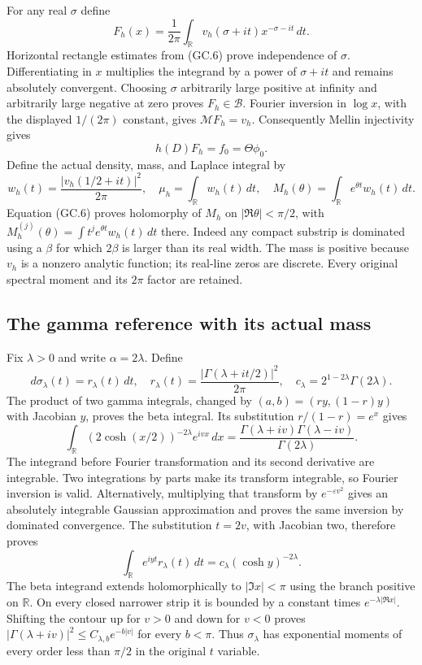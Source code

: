 For any real $\sigma$ define
\[
 F_h(x)=\frac1{2\pi}\int_{\mathbb R}
              v_h(\sigma+it)x^{-\sigma-it}\,dt.                \tag{GC.7}
\]
Horizontal rectangle estimates from (GC.6) prove independence of
$\sigma$. Differentiating in $x$ multiplies the integrand by a
power of $\sigma+it$ and remains absolutely convergent. Choosing
$\sigma$ arbitrarily large positive at infinity and arbitrarily
large negative at zero proves $F_h\in\mathscr B$. Fourier inversion
in $\log x$, with the displayed $1/(2\pi)$ constant, gives
$\mathcal MF_h=v_h$. Consequently Mellin injectivity gives
\[
 h(D)F_h=f_0=\Theta\phi_0.                                    \tag{GC.8}
\]
Define the actual density, mass, and Laplace integral by
\[
 w_h(t)=\frac{|v_h(1/2+it)|^2}{2\pi},\quad
 \mu_h=\int_{\mathbb R}w_h(t)\,dt,\quad
 M_h(\theta)=\int_{\mathbb R}e^{\theta t}w_h(t)\,dt.
                                                               \tag{GC.9}
\]
Equation (GC.6) proves holomorphy of $M_h$ on
$|\Re\theta|<\pi/2$, with
$M_h^{(j)}(\theta)=\int t^je^{\theta t}w_h(t)\,dt$ there.
Indeed any compact substrip is dominated using a $\beta$ for which
$2\beta$ is larger than its real width. The mass is positive because
$v_h$ is a nonzero analytic function; its real-line zeros are discrete.
Every original spectral moment and its $2\pi$ factor are retained.

\subsection{The gamma reference with its actual mass}

Fix $\lambda>0$ and write $\alpha=2\lambda$. Define
\[
 d\sigma_\lambda(t)=r_\lambda(t)\,dt,
 \quad r_\lambda(t)=\frac{|\Gamma(\lambda+it/2)|^2}{2\pi},
 \quad c_\lambda=2^{1-2\lambda}\Gamma(2\lambda).
                                                               \tag{GC.10}
\]
The product of two gamma integrals, changed by
$(a,b)=(ry,(1-r)y)$ with Jacobian $y$, proves the beta integral.
Its substitution $r/(1-r)=e^x$ gives
\[
 \int_{\mathbb R}(2\cosh(x/2))^{-2\lambda}e^{ivx}\,dx
 =\frac{\Gamma(\lambda+iv)\Gamma(\lambda-iv)}{\Gamma(2\lambda)}.
\]
The integrand before Fourier transformation and its second derivative
are integrable. Two integrations by parts make its transform
integrable, so Fourier inversion is valid. Alternatively, multiplying
that transform by $e^{-\varepsilon v^2}$ gives an absolutely
integrable Gaussian approximation and proves the same inversion by
dominated convergence. The substitution $t=2v$, with Jacobian two,
therefore proves
\[
 \int_{\mathbb R}e^{iyt}r_\lambda(t)\,dt
       =c_\lambda(\cosh y)^{-2\lambda}.                        \tag{GC.11}
\]
The beta integrand extends holomorphically to $|\Im x|<\pi$ using
the branch positive on $\mathbb R$. On every closed narrower strip
it is bounded by a constant times $e^{-\lambda|\Re x|}$.
Shifting the contour up for $v>0$ and down for $v<0$ proves
$|\Gamma(\lambda+iv)|^2\le C_{\lambda,b}e^{-b|v|}$ for every
$b<\pi$. Thus $\sigma_\lambda$ has exponential moments of every
order less than $\pi/2$ in the original $t$ variable.

